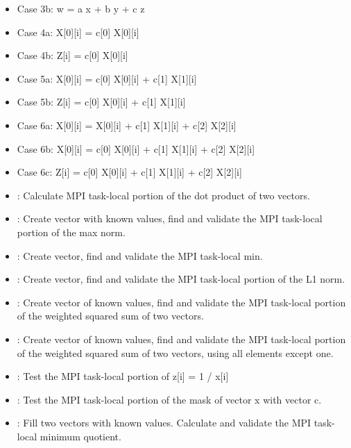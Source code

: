 \begin{itemize}
\item {} Case 3b: w = a x + b y + c z
\item {} Case 4a: X[0][i] = c[0] X[0][i]
\item {} Case 4b: Z[i] = c[0] X[0][i]
\item {} Case 5a: X[0][i] = c[0] X[0][i] + c[1] X[1][i]
\item {} Case 5b: Z[i] = c[0] X[0][i] + c[1] X[1][i]
\item {} Case 6a: X[0][i] = X[0][i] + c[1] X[1][i] + c[2] X[2][i]
\item {} Case 6b: X[0][i] = c[0] X[0][i] + c[1] X[1][i] + c[2] X[2][i]
\item {} Case 6c: Z[i] = c[0] X[0][i] + c[1] X[1][i] + c[2] X[2][i]
\item {}: Calculate MPI task-local portion of the dot product of two vectors.
\item {}: Create vector with known values, find and validate the MPI task-local portion of the max norm.
\item {}: Create vector, find and validate the MPI task-local min.
\item {}: Create vector, find and validate the MPI task-local portion of the L1 norm.
\item {}: Create vector of known values, find and validate the MPI task-local portion of the weighted squared sum of two vectors.
\item {}: Create vector of known values, find and validate the MPI task-local portion of the weighted squared sum of two vectors, using all elements except one.
\item {}: Test the MPI task-local portion of z[i] = 1 / x[i]
\item {}: Test the MPI task-local portion of the mask of vector x with vector c.
\item {}: Fill two vectors with known values. Calculate and validate the MPI task-local minimum quotient.
\end{itemize}
